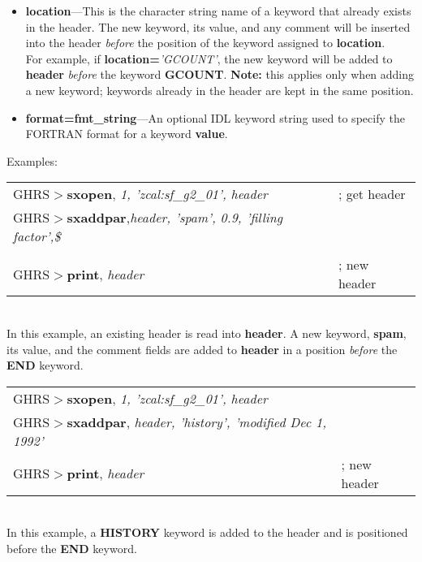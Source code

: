 \begin{description}
\begin{itemize}
\item {\bf location}---This is the character string name of a keyword that 
already exists in the header.  The new keyword, its value, and any comment will
be inserted into the header {\it before} the position of the 
keyword assigned to {\bf location}.\\

\noindent
For example, if {\bf location=}{\it 'GCOUNT'}, the new keyword 
will be added to {\bf header} {\it before} the keyword {\bf GCOUNT}.
{\bf Note:} this applies only when adding a new keyword; keywords already in 
the header are kept in the same position.

\item {\bf format=fmt\_string}---An optional IDL keyword string used to 
specify the FORTRAN format for a keyword {\bf value}.
\end{itemize}
\newpage

\noindent
Examples:\\

\begin{tabular}{ll}
GHRS$>${\bf sxopen}, {\it 1, 'zcal:sf\_g2\_01', header} & ; get header\\
GHRS$>${\bf sxaddpar},{\it header, 'spam', 0.9, 'filling factor',\$} & \\ 
\hspace{1.1in}{\it 'end', format='f4.1'} & \\
GHRS$>${\bf print}, {\it header} & ; new header \\
\end{tabular}\\

\noindent
In this example, an existing header is read into {\bf header}.  A new keyword, 
{\bf spam}, its value, and the comment fields are added to {\bf header} in a 
position {\it before} the {\bf END} keyword.\\

\begin{tabular}{ll}
GHRS$>${\bf sxopen}, {\it 1, 'zcal:sf\_g2\_01', header} & \\
GHRS$>${\bf sxaddpar}, {\it header, 'history', 'modified Dec 1, 1992'} & \\
GHRS$>${\bf print}, {\it header} & ; new header \\
\end{tabular}\\

\noindent
In this example, a {\bf HISTORY} keyword is added to the header and is 
positioned before the {\bf END} keyword.\\


\end{description}
